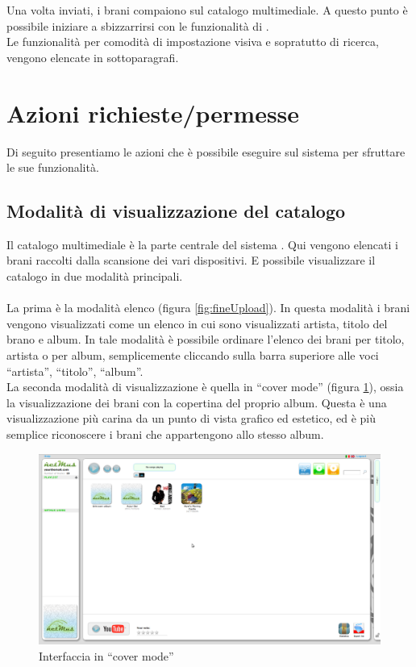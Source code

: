 Una volta inviati, i brani compaiono sul catalogo multimediale.
A questo punto \`e possibile iniziare a sbizzarrirsi con le funzionalit\`a di
.\\

Le funzionalit\`a per comodit\`a di impostazione visiva e
sopratutto di ricerca, vengono elencate in sottoparagrafi.

\newpage
\section{Azioni richieste/permesse}
Di seguito presentiamo le azioni che \`e possibile eseguire sul sistema per
sfruttare le sue funzionalit\`a.

\subsection{Modalit\`a di visualizzazione del catalogo}
Il catalogo multimediale \`e la parte centrale del sistema . Qui
vengono elencati i brani raccolti dalla scansione dei vari dispositivi. E
possibile visualizzare il catalogo in due modalit\`a principali.\\
\\
La prima \`e la modalit\`a elenco (figura \ref{fig:fineUpload}). In questa
modalit\`a i brani vengono visualizzati come un elenco in cui sono visualizzati artista, titolo del brano e
album. In tale modalit\`a \`e possibile ordinare l'elenco dei brani per titolo,
artista o per album, semplicemente cliccando sulla barra superiore alle voci
``artista'', ``titolo'', ``album''.\\

La seconda modalit\`a di visualizzazione \`e quella in ``cover mode'' (figura
\ref{fig:coverMode}), ossia la visualizzazione dei brani con la copertina del
proprio album. Questa \`e una visualizzazione pi\`u carina da un punto di vista grafico ed estetico, ed \`e
pi\`u semplice riconoscere i brani che appartengono allo stesso album.\\

\begin{figure}[!htbp]
  \centering
  \includegraphics[width=14cm]{img/MU/cover_mode.png}
\caption{Interfaccia in ``cover mode''}
\label{fig:coverMode}
\end{figure}

